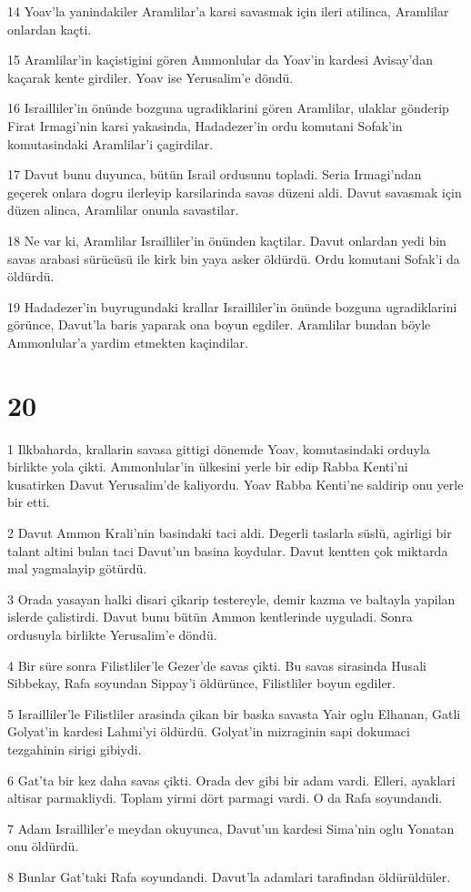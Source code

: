 \par 14 Yoav'la yanindakiler Aramlilar'a karsi savasmak için ileri atilinca, Aramlilar onlardan kaçti.
\par 15 Aramlilar'in kaçistigini gören Ammonlular da Yoav'in kardesi Avisay'dan kaçarak kente girdiler. Yoav ise Yerusalim'e döndü.
\par 16 Israilliler'in önünde bozguna ugradiklarini gören Aramlilar, ulaklar gönderip Firat Irmagi'nin karsi yakasinda, Hadadezer'in ordu komutani Sofak'in komutasindaki Aramlilar'i çagirdilar.
\par 17 Davut bunu duyunca, bütün Israil ordusunu topladi. Seria Irmagi'ndan geçerek onlara dogru ilerleyip karsilarinda savas düzeni aldi. Davut savasmak için düzen alinca, Aramlilar onunla savastilar.
\par 18 Ne var ki, Aramlilar Israilliler'in önünden kaçtilar. Davut onlardan yedi bin savas arabasi sürücüsü ile kirk bin yaya asker öldürdü. Ordu komutani Sofak'i da öldürdü.
\par 19 Hadadezer'in buyrugundaki krallar Israilliler'in önünde bozguna ugradiklarini görünce, Davut'la baris yaparak ona boyun egdiler. Aramlilar bundan böyle Ammonlular'a yardim etmekten kaçindilar.

\chapter{20}

\par 1 Ilkbaharda, krallarin savasa gittigi dönemde Yoav, komutasindaki orduyla birlikte yola çikti. Ammonlular'in ülkesini yerle bir edip Rabba Kenti'ni kusatirken Davut Yerusalim'de kaliyordu. Yoav Rabba Kenti'ne saldirip onu yerle bir etti.
\par 2 Davut Ammon Krali'nin basindaki taci aldi. Degerli taslarla süslü, agirligi bir talant altini bulan taci Davut'un basina koydular. Davut kentten çok miktarda mal yagmalayip götürdü.
\par 3 Orada yasayan halki disari çikarip testereyle, demir kazma ve baltayla yapilan islerde çalistirdi. Davut bunu bütün Ammon kentlerinde uyguladi. Sonra ordusuyla birlikte Yerusalim'e döndü.
\par 4 Bir süre sonra Filistliler'le Gezer'de savas çikti. Bu savas sirasinda Husali Sibbekay, Rafa soyundan Sippay'i öldürünce, Filistliler boyun egdiler.
\par 5 Israilliler'le Filistliler arasinda çikan bir baska savasta Yair oglu Elhanan, Gatli Golyat'in kardesi Lahmi'yi öldürdü. Golyat'in mizraginin sapi dokumaci tezgahinin sirigi gibiydi.
\par 6 Gat'ta bir kez daha savas çikti. Orada dev gibi bir adam vardi. Elleri, ayaklari altisar parmakliydi. Toplam yirmi dört parmagi vardi. O da Rafa soyundandi.
\par 7 Adam Israilliler'e meydan okuyunca, Davut'un kardesi Sima'nin oglu Yonatan onu öldürdü.
\par 8 Bunlar Gat'taki Rafa soyundandi. Davut'la adamlari tarafindan öldürüldüler.

